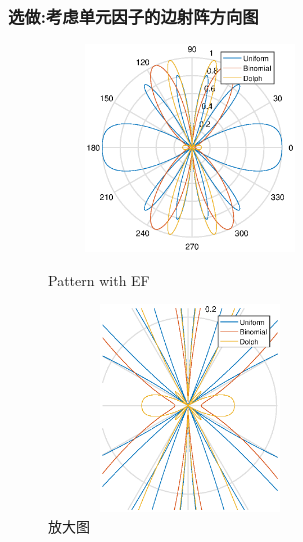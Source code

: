 \subsubsection{选做:考虑单元因子的边射阵方向图}
\begin{figure}[!ht]
	\begin{minipage}[t]{0.35\linewidth}
		\centering
		\includegraphics[height=5.5cm,width=7.5cm]{TenEle_with_EF.eps}
		\caption{Pattern with EF}
	\end{minipage}%
	\hfill
	\begin{minipage}[t]{0.5\linewidth}
		\centering
		\includegraphics[height=5.5cm,width=7.5cm]{TenEle_with_EF_fangda.eps}
		\caption{放大图}
		
	\end{minipage}\label{fig:10eleEF}
\end{figure}

